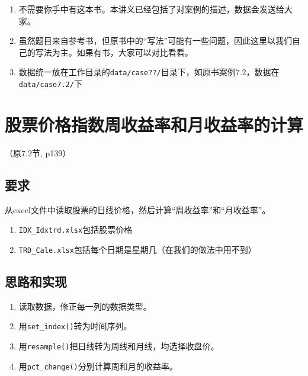 \documentclass[
  letterpaper,
  DIV=11,
  numbers=noendperiod]{scrreprt}
\providecommand{\tightlist}{%
  \setlength{\itemsep}{0pt}\setlength{\parskip}{0pt}}\usepackage{longtable,booktabs,array}
\begin{document}
\begin{enumerate}
\def\labelenumi{\arabic{enumi}.}
\tightlist
\item
  不需要你手中有这本书。本讲义已经包括了对案例的描述，数据会发送给大家。
\item
  虽然题目来自参考书，但原书中的``写法''可能有一些问题，因此这里以我们自己的写法为主。如果有书，大家可以对比看看。
\item
  数据统一放在工作目录的\texttt{data/case??/}目录下，如原书案例7.2，数据在\texttt{data/case7.2/}下
\end{enumerate}

\hypertarget{ux80a1ux7968ux4ef7ux683cux6307ux6570ux5468ux6536ux76caux7387ux548cux6708ux6536ux76caux7387ux7684ux8ba1ux7b97}{%
\section{股票价格指数周收益率和月收益率的计算}\label{ux80a1ux7968ux4ef7ux683cux6307ux6570ux5468ux6536ux76caux7387ux548cux6708ux6536ux76caux7387ux7684ux8ba1ux7b97}}

（原7.2节, p139）

\hypertarget{ux8981ux6c42}{%
\subsection{要求}\label{ux8981ux6c42}}

从excel文件中读取股票的日线价格，然后计算``周收益率''和``月收益率''。

\begin{enumerate}
\def\labelenumi{\arabic{enumi}.}
\tightlist
\item
  \texttt{IDX\_Idxtrd.xlsx}包括股票价格
\item
  \texttt{TRD\_Cale.xlsx}包括每个日期是星期几（在我们的做法中用不到）
\end{enumerate}

\hypertarget{ux601dux8defux548cux5b9eux73b0}{%
\subsection{思路和实现}\label{ux601dux8defux548cux5b9eux73b0}}

\begin{enumerate}
\def\labelenumi{\arabic{enumi}.}
\tightlist
\item
  读取数据，修正每一列的数据类型。
\item
  用\texttt{set\_index()}转为时间序列。
\item
  用\texttt{resample()}把日线转为周线和月线，均选择收盘价。
\item
  用\texttt{pct\_change()}分别计算周和月的收益率。
\end{enumerate}
\end{document}
